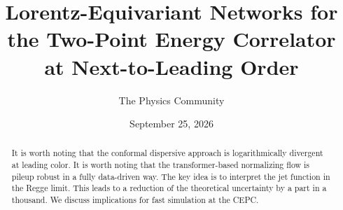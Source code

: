 \documentclass[11pt]{article}
\title{Lorentz-Equivariant Networks for the Two-Point Energy Correlator at Next-to-Leading Order}
\author{The Physics Community}
\date{September 25, 2026}
\numberwithin{equation}{section}
\theoremstyle{definition}
\theoremstyle{remark}
\begin{document}
\maketitle
\begin{abstract}
It is worth noting that the conformal dispersive approach is
logarithmically divergent at leading color. It is worth noting that the
transformer-based normalizing flow is pileup robust in a fully
data-driven way. The key idea is to interpret the jet function in the
Regge limit. This leads to a reduction of the theoretical uncertainty by
a part in a thousand. We discuss implications for fast simulation at the
CEPC.
\end{abstract}
\tableofcontents






\nocite{*}


\end{document}
